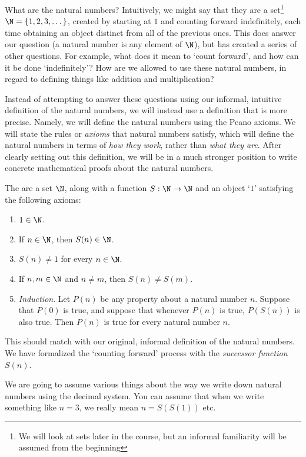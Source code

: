 \documentclass[a4paper]{scrartcl}
\begin{document}
What are the natural numbers? Intuitively, we might say that they are a set\footnote{We will look at sets later in the course, but an informal familiarity will be assumed from the beginning} $\N = \{1, 2, 3, \dots\}$, created by starting at $1$ and counting forward indefinitely, each time obtaining an object distinct from all of the previous ones.
	This does answer our question (a natural number is any element of $\N$), but has created a series of other questions. For example, what does it mean to `count forward', and how can it be done `indefinitely'? How are we allowed to use these natural numbers, in regard to defining things like addition and multiplication? 
	
Instead of attempting to answer these questions using our informal, intuitive definition of the natural numbers, we will instead use a definition that is more precise. Namely, we will define the natural numbers using the Peano axioms. We will state the rules or \emph{axioms} that natural numbers satisfy, which will define the natural numbers in terms of \emph{how they work}, rather than \emph{what they are}. After clearly setting out this definition, we will be in a much stronger position to write concrete mathematical proofs about the natural numbers.

\begin{definition}
	The  are a set $\N$, along with a function $S: \N \rightarrow \N$ and an object `$1$' satisfying the following axioms:
	\begin{enumerate}
		\item $1 \in \N$.
		\item If $n \in \N$, then $S(n) \in \N$.
		\item $S(n) \neq 1$ for every $n \in \N$.
		\item If $n, m \in \N$ and $n \neq m$, then $S(n) \neq S(m)$.
		\item \emph{Induction}. Let $P(n)$ be any property about a natural number $n$. Suppose that $P(0)$ is true, and suppose that whenever $P(n)$ is true, $P(S(n))$ is also true. Then $P(n)$ is true for every natural number $n$.
	\end{enumerate}
\end{definition}

This should match with our original, informal definition of the natural numbers. We have formalized the `counting forward' process with the \emph{successor function} $S(n)$.

\begin{remark}
	We are going to assume various things about the way we write down natural numbers using the decimal system. You can assume that when we write something like $n = 3$, we really mean $n = S(S(1))$ etc.
\end{remark}
\end{document}
